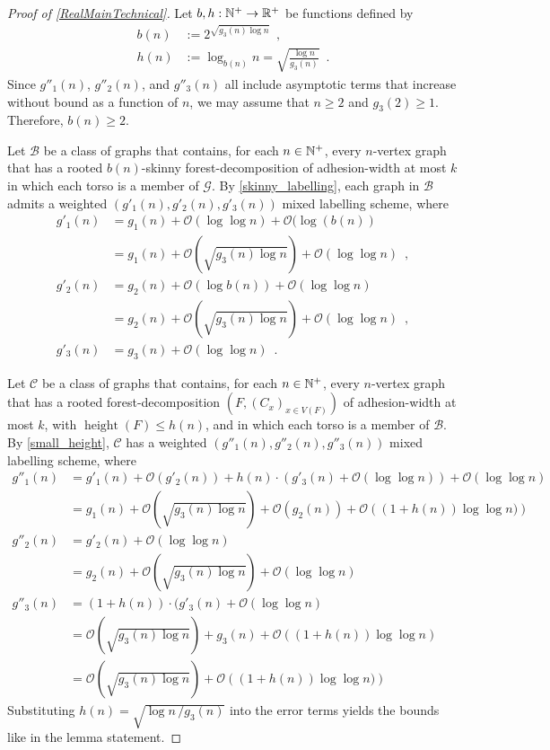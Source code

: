 \documentclass{patmorin}
\renewcommand{\ge}{\geqslant}
\renewcommand{\leq}{\leqslant}
\newcommand{\piotr}[1]{\noindent\textcolor{red}{PiMi: #1}}
\DeclareMathOperator{\height}{height}
\newcommand{\Oh}{\calO}
\newcommand{\calB}{\mathcal{B}}
\newcommand{\calC}{\mathcal{C}}
\newcommand{\calG}{\mathcal{G}}
\newcommand{\calO}{\mathcal{O}}
\begin{document}
  \begin{proof}[Proof of \cref{RealMainTechnical}]
    Let $b,h:\mathbb{N}^+\to\mathbb{R}^+$ be functions defined by 
    \begin{align*}
      b(n) &:=2^{\sqrt{g_3(n)\log n}}\enspace,\\
      h(n) &:= \log_{b(n)}n = \sqrt{\frac{\log n}{g_3(n)}} \enspace .
    \end{align*}
    Since $g''_1(n)$, $g''_2(n)$, and $g''_3(n)$ all include asymptotic terms that increase without bound as a function of $n$, we may assume that $n\ge 2$ and $g_3(2)\ge 1$.  Therefore, $b(n)\ge 2$.

    
    Let $\calB$ be a class of graphs that contains, for each $n\in\mathbb{N}^+$, every $n$-vertex graph that has a rooted $b(n)$-skinny forest-decomposition of adhesion-width at most $k$ in which each torso is a member of $\calG$. 
    By \cref{skinny_labelling}, each graph in $\calB$ admits a 
    weighted $(g'_1(n),g'_2(n),g'_3(n))$ mixed labelling scheme, where
    \begin{align*}
     g'_1(n) & = g_1(n) + \Oh(\log\log n) + \Oh(\log(b(n))\\
     & = g_1(n) + \Oh\left(\sqrt{g_3(n) \log n}\right) + \Oh(\log\log n)\enspace, \\
     g'_2(n) & = g_2(n)+ \Oh(\log b(n))+\Oh(\log\log n)\\
          & = g_2(n) + \Oh\left(\sqrt{g_3(n) \log n}\right) + \Oh(\log\log n)\enspace, \\
     g'_3(n) & = g_3(n) + \Oh(\log\log n)\enspace.
    \end{align*}

    Let $\calC$ be a class of graphs that contains, for each $n\in\mathbb{N}^+$, 
    every $n$-vertex graph that has a rooted forest-decomposition $(F,(C_x)_{x\in V(F)})$
    of adhesion-width at most $k$, with $\height(F)\leq h(n)$, and  
    in which each torso is a member of $\calB$. 
    By \cref{small_height}, $\calC$ has a weighted $(g''_1(n),g''_2(n),g''_3(n))$ mixed labelling scheme, where
    \begin{align*}
     g''_1(n) & = g'_1(n) + \Oh(g'_2(n)) + h(n)\cdot (g'_3(n)+\Oh(\log\log n)) + \Oh(\log\log n) \\
       & = g_1(n) +  \Oh\left(\sqrt{g_3(n) \log n}\right) + \Oh(g_2(n)) + \Oh\left((1+h(n))\log\log n)\right) \\
     g''_2(n) & = g'_2(n) + \Oh(\log\log n) \\
       & = g_2(n) + \Oh\left(\sqrt{{g_3(n)\log n}}\right) + \Oh(\log\log n) \\
     g''_3(n) & = (1+h(n))\cdot (g'_3(n)+\Oh(\log\log n)\\%
       & = \Oh\left(\sqrt{g_3(n)\log n}\right) + g_3(n) + \Oh\left((1+h(n))\log\log n\right) \\
       & = \Oh\left(\sqrt{g_3(n) \log n}\right) + \Oh\left((1+h(n))\log\log n)\right)
   \end{align*}
   Substituting $h(n) = \sqrt{\log n\, / g_3(n)}$ into the error terms yields the bounds like in the lemma statement.


\end{proof}
\end{document}
